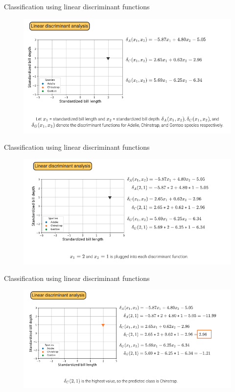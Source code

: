 \documentclass[10pt,dvipsnames]{beamer}
\begin{document}
\begin{frame}{Classification using linear discriminant functions}
	\begin{figure}[ht]
		\centering
		\includegraphics[width=\textwidth]{imgs/df_2.png}
	\end{figure}
\end{frame}

\begin{frame}{Classification using linear discriminant functions}
	\begin{figure}[ht]
		\centering
		\includegraphics[width=\textwidth]{imgs/df_3.png}
	\end{figure}
\end{frame}

\begin{frame}{Classification using linear discriminant functions}
	\begin{figure}[ht]
		\centering
		\includegraphics[width=\textwidth]{imgs/df_4.png}
	\end{figure}
\end{frame}
\end{document}
